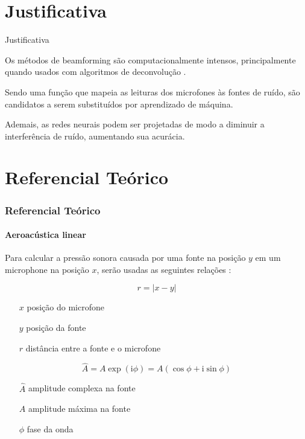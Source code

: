 \documentclass[aspectratio=169]{beamer}
\newcommand{\iu}{\mathrm{i}}
\begin{document}
\section{Justificativa}
\begin{frame}{Justificativa}

Os métodos de beamforming são computacionalmente intensos, 
principalmente quando usados com algoritmos de deconvolução
\cite{carranza_2022_beamforming}.
\vspace{5pt}

Sendo uma função que mapeia as leituras dos microfones
às fontes de ruído,
são candidatos a serem substituídos por
aprendizado de máquina.
\vspace{5pt}

Ademais, as redes neurais podem ser projetadas
de modo a diminuir a interferência de ruído,
\cite{ibias2024noise}
aumentando sua acurácia.

\end{frame}

\section{Referencial Teórico}
\begin{frame}
\frametitle{Referencial Teórico}
\framesubtitle{Aeroacústica linear}

Para calcular a pressão sonora
causada por uma fonte na posição $y$
em um microphone na posição $x$,
serão usadas as seguintes relações \cite{Glegg2023-mi}:

\begin{equation}
    r = |x - y|
\end{equation}

\begin{itemize}
    \item[$x$] posição do microfone
    \item[$y$] posição da fonte
    \item[$r$] distância entre a fonte e o microfone
\end{itemize}

\begin{equation}
    \hat{A} = A \exp(\iu \phi) = A (\cos\phi + \iu \sin\phi)
\end{equation}

\begin{itemize}
    \item[$\hat{A}$] amplitude complexa na fonte
    \item[$A$] amplitude máxima na fonte
    \item[$\phi$] fase da onda
\end{itemize}
\end{frame}
\end{document}
